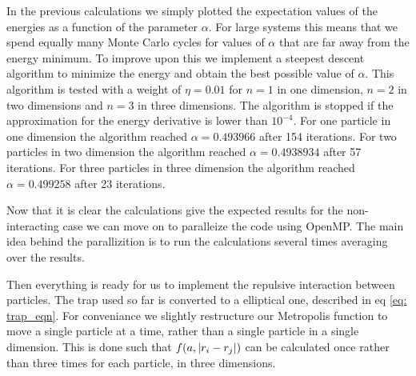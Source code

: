 \documentclass[a4paper, 10pt, english]{revtex4-2} %
\begin{document}
    In the previous calculations we simply plotted the expectation values of the energies as a function of the parameter $\alpha$.
    For large systems this means that we spend equally many Monte Carlo cycles for values of $\alpha$ that are far away from the energy minimum.
    To improve upon this we implement a steepest descent algorithm to minimize the energy and obtain the best possible value of $\alpha$.
    This algorithm is tested with a weight of $\eta = 0.01$ for $n = 1$ in one dimension, $n = 2$ in two dimensions and $n = 3$ in three dimensions.
    The algorithm is stopped if the approximation for the energy derivative is lower than $10^{-4}$.
    For one particle in one dimension the algorithm reached $\alpha = 0.493966$ after 154 iterations.
    For two particles in two dimension the algorithm reached $\alpha = 0.4938934$ after 57 iterations.
    For three particles in three dimension the algorithm reached $\alpha = 0.499258$ after 23 iterations.

    Now that it is clear the calculations give the expected results for the non-interacting case we can move on to paralleize the code using OpenMP.
    The main idea behind the parallizition is to run the calculations several times averaging over the results.

    Then everything is ready for us to implement the repulsive interaction between particles.
    The trap used so far is converted to a elliptical one, described in eq \ref{eq: trap_eqn}.
    For conveniance we slightly restructure our Metropolis function to move a single particle at a time, rather than a single particle in a single dimension.
    This is done such that $f(a, \abs{r_i - r_j})$ can be calculated once rather than three times for each particle, in three dimensions. 
\end{document}
